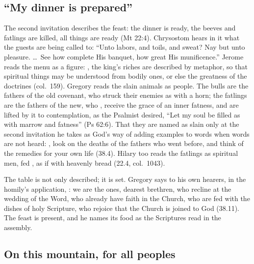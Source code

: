 \subsection{``My dinner is prepared''}

The second invitation describes the feast: the dinner is ready, the beeves and
fatlings are killed, all things are ready (Mt 22:4). Chrysostom hears in it
what the guests are being called to: ``Unto labors, and toils, and sweat? Nay
but unto pleasure. \ldots\ See how complete His banquet, how great His
munificence.'' Jerome reads the menu as a figure: , the king's riches are described by metaphor, so that
spiritual things may be understood from bodily ones, or else the greatness of
the doctrines (col.~159). Gregory reads the slain animals as people. The bulls
are the fathers of the old covenant, who struck their enemies as with a horn;
the fatlings are the fathers of the new, who , receive the grace of an inner fatness, and are lifted by
it to contemplation, as the Psalmist desired, ``Let my soul be filled as with
marrow and fatness'' (Ps 62:6). That they are named as slain only at the
second invitation he takes as God's way of adding examples to words when words
are not heard: , look on the deaths of the fathers who went before, and think
of the remedies for your own life (38.4). Hilary too reads the fatlings as
spiritual men, fed , as if with heavenly bread
(22.4, col.~1043).

The table is not only described; it is set. Gregory says to his own hearers,
in the homily's application, : we are
the ones, dearest brethren, who recline at the wedding of the Word, who
already have faith in the Church, who are fed with the dishes of holy
Scripture, who rejoice that the Church is joined to God (38.11). The feast is
present, and he names its food as the Scriptures read in the assembly.

\subsection{On this mountain, for all peoples}

